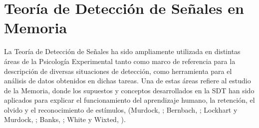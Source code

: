 \begin{itemize}
\end{itemize}


















\section{Teoría de Detección de Señales en Memoria}

La Teoría de Detección de Señales ha sido ampliamente utilizada en distintas áreas de la Psicología Experimental tanto como marco de referencia para la descripción de diversas situaciones de detección, como herramienta para el análisis de datos obtenidos en dichas tareas. Una de estas áreas refiere al estudio de la Memoria, donde los supuestos y conceptos desarrollados en la SDT han sido aplicados para explicar el funcionamiento del aprendizaje humano, la retención, el olvido y el reconocimiento de estímulos, (Murdock, \citeyear{Murdock1965}; Bernbach, \citeyear{Bernbach1967}; Lockhart y Murdock, \citeyear{Lockhart1970}; Banks, \citeyear{Banks1970}; White y Wixted, \citeyear{White1999}).\\


